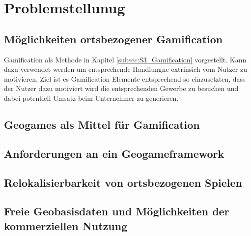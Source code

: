 \section{Problemstellunug}
\label{sec:S2_Problemstellunug}

\subsection{Möglichkeiten ortsbezogener Gamification}

Gamification als Methode in Kapitel \ref{subsec:S3_Gamification} vorgestellt.
Kann dazu verwendet werden um entsprechende Handlungne extrinsich vom Nutzer zu motivieren.
Ziel ist es Gamification Elemente entsprechend so einzusetzten, dass der Nutzer dazu motiviert wird die entsprechenden Gewerbe zu besuchen und dabei potentiell Umsatz beim Unternehmer zu generieren.
 

\subsection{Geogames als Mittel für Gamification}

\subsection{Anforderungen an ein Geogameframework}

\subsection{Relokalisierbarkeit von ortsbezogenen Spielen}

\subsection{Freie Geobasisdaten und Möglichkeiten der kommerziellen Nutzung}